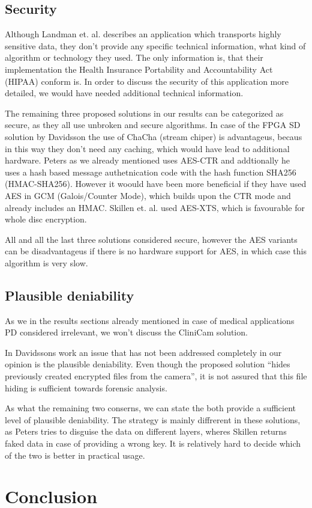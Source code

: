\documentclass[12pt,a4paper,titlepage,oneside]{scrartcl}
\begin{document}
\subsection{Security}
Although Landman et. al. describes an application which transports highly sensitive data, they don't provide any specific technical information, what kind of algorithm or technology they used.
The only information is, that their implementation the Health Insurance Portability and Accountability Act (HIPAA) conform is.
In order to discuss the security of this application more detailed, we would have needed additional technical information.

The remaining three proposed solutions in our results can be categorized as secure, as they all use unbroken and secure algorithms.
In case of the FPGA SD solution by Davidsson the use of ChaCha (stream chiper) is advantageus, becaus in this way they don't need any caching, which would have lead to additional hardware.
Peters as we already mentioned uses AES-CTR and addtionally he uses a hash based message authetnication code with the hash function SHA256 (HMAC-SHA256).
However it woould have been more beneficial if they have used AES in GCM (Galois/Counter Mode), which builds upon the CTR mode and already includes an HMAC. \cite{mcgrew2004security}
Skillen et. al. used AES-XTS, which is favourable for whole disc encryption.

All and all the last three solutions considered secure, however the AES variants can be disadvantageus if there is no hardware support for AES, in which case this algorithm is very slow.

\subsection{Plausible deniability}
As we in the results sections already mentioned in case of medical applications PD considered irrelevant, we won't discuss the CliniCam solution.

In Davidssons work an issue that has not been addressed completely in our opinion is the plausible deniability.
Even though the proposed solution ``hides previously created encrypted files from the camera'', it is not assured that this file hiding is sufficient towards forensic analysis.

As what the remaining two conserns, we can state the both provide a sufficient level of plausible deniability.
The strategy is mainly diffrerent in these solutions, as Peters tries to disguise the data on different layers, wheres Skillen returns faked data in case of providing a wrong key.
It is relatively hard to decide which of the two is better in practical usage.

\newpage
\section{Conclusion}
\newpage




\end{document}
